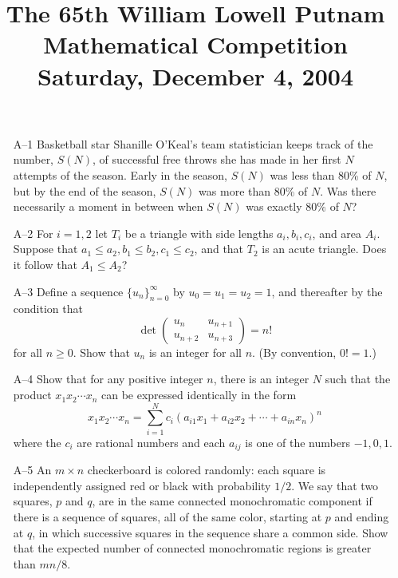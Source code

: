 \documentclass[amssymb,twocolumn,pra,10pt,aps]{revtex4-1}
\begin{document}
\title{The 65th William Lowell Putnam Mathematical Competition \\
    Saturday, December 4, 2004}
\maketitle

\begin{itemize}

\item[A--1]
Basketball star Shanille O'Keal's team statistician
keeps track of the number, $S(N)$, of successful free throws she has made
in her first $N$ attempts of the season.
Early in the season, $S(N)$  was less than 80\% of  $N$,
but by the end of the season, $S(N)$ was more than 80\% of $N$.
Was there necessarily a moment in between when $S(N)$ was exactly 80\% of
$N$?

\item[A--2]
For $i = 1,2$ let $T_i$ be a triangle with side lengths $a_i, b_i, c_i$,
and area $A_i$.  Suppose that $a_1 \le a_2,  b_1 \le b_2,  c_1 \le
c_2$,
and that $T_2$ is an acute triangle. Does it follow that $A_1
\le A_2$?

\item[A--3]
Define a sequence $\{ u_n \}_{n=0}^\infty$
by  $u_0 = u_1 = u_2 = 1$, and thereafter by
the
condition that
\[
\det\begin{pmatrix}
u_n &   u_{n+1}\\
u_{n+2} & u_{n+3}
\end{pmatrix}
= n!
\]
for all $n \ge 0$. Show that $u_n$ is an integer for all $n$.
(By convention, $0! = 1$.)

\item[A--4]
Show that for any positive integer $n$, there is an integer $N$ such that
the product $x_1 x_2 \cdots x_n$ can be expressed identically in the form
\[
x_1 x_2 \cdots x_n =
\sum_{i=1}^N  c_i
( a_{i1} x_1 + a_{i2} x_2 + \cdots + a_{in} x_n )^n
\]
where the $c_i$ are rational numbers and each $a_{ij}$ is one of the
numbers $-1, 0, 1$.

\item[A--5]
An $m \times n$ checkerboard is colored randomly: each square is
independently
assigned red or black with probability $1/2$. We say that two squares,
$p$ and $q$,  are in the same connected monochromatic component if there is
a sequence of squares, all of the same color, starting at $p$ and ending
at $q$, in which successive squares in the sequence share a common side.
Show that the expected number of connected monochromatic regions is
greater than $m n / 8$.


\end{itemize}
\end{document}
